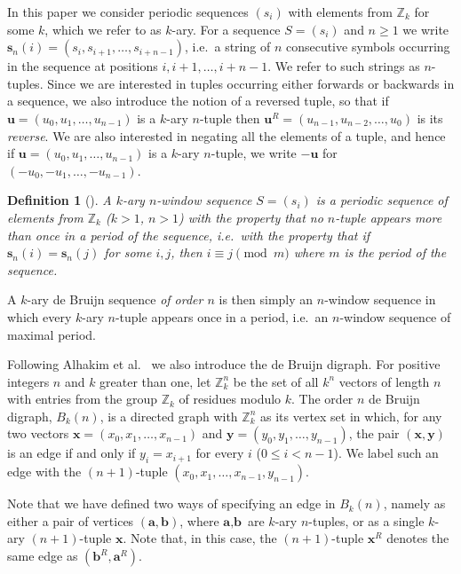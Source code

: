 \documentclass[a4paper,11pt]{article}
\newtheorem{definition}[lemma]{Definition}
\begin{document}
 In this paper we consider periodic sequences $(s_i)$ with elements from $\mathbb{Z}_k$
for some $k$, which we refer to as $k$-ary.  For a sequence $S = (s_i)$ and $n\geq1$
we write $\mathbf{s}_n(i) = (s_i,s_{i+1},\ldots,s_{i+n-1})$, i.e.\ a string of $n$ consecutive
symbols occurring in the sequence at positions $i,i+1,\ldots,i+n-1$.  We refer to such
strings as $n$-tuples. Since we are interested in tuples occurring either forwards or
backwards in a sequence, we also introduce the notion of a reversed tuple, so that if $\mathbf{u}
=
(u_0,u_1,\ldots,u_{n-1})$ is a $k$-ary $n$-tuple then $\mathbf{u}^R = (u_{n-1},u_{n-2},
\ldots,u_0)$ is its \emph{reverse}.  We are also interested in negating all the elements of a
tuple, and hence if $\mathbf{u} = (u_0,u_1,\ldots,u_{n-1})$ is a $k$-ary $n$-tuple, we write
$-\mathbf{u}$ for $(-u_0,-u_1,\ldots,-u_{n-1})$.

\begin{definition}[\cite{Alhakim24a}]
A $k$-ary \emph{$n$-window sequence $S = (s_i)$} is a periodic sequence of elements from
$\mathbb{Z}_k$ ($k>1$, $n>1$) with the property that no $n$-tuple appears more than once in a
period of the sequence, i.e.\ with the property that if $\mathbf{s}_n(i) = \mathbf{s}_n(j)$ for
some $i,j$, then $i \equiv j \pmod m$ where $m$ is the period of the sequence.
\end{definition}

A $k$-ary de Bruijn sequence \emph{of order $n$} is then simply an $n$-window sequence in which
every $k$-ary $n$-tuple appears once in a period, i.e.\ an $n$-window sequence of maximal period.

Following Alhakim et al.\ \cite{Alhakim24a} we also introduce the de Bruijn digraph. For positive
integers $n$ and $k$ greater than one, let $\mathbb{Z}_k^n$ be the set of all $k^n$ vectors of
length $n$ with entries from the group $\mathbb{Z}_k$ of residues modulo $k$. The order $n$ de
Bruijn digraph, $B_k(n)$, is a directed graph with $\mathbb{Z}^n_k$ as its vertex set in which,
for
any two vectors $\textbf{x} = (x_0,x_1,\ldots,x_{n-1})$ and $\textbf{y} =
(y_0,y_1,\ldots,y_{n-1})$, the pair $(\textbf{x},\textbf{y})$ is an edge if and only if $y_i =
x_{i+1}$ for every $i$ ($0\leq i< n-1$). We label such an edge with the $(n+1)$-tuple
$(x_0,x_1,\ldots,x_{n-1},y_{n-1})$.

Note that we have defined two ways of specifying an edge in $B_k(n)$, namely as either a pair of
vertices $(\textbf{a},\textbf{b})$, where $\textbf{a},\textbf{b}$ are $k$-ary $n$-tuples, or as a
single $k$-ary $(n+1)$-tuple $\textbf{x}$.  Note that, in this case, the $(n+1)$-tuple
$\textbf{x}^R$ denotes the same edge as $(\textbf{b}^R,\textbf{a}^R)$.
\end{document}
